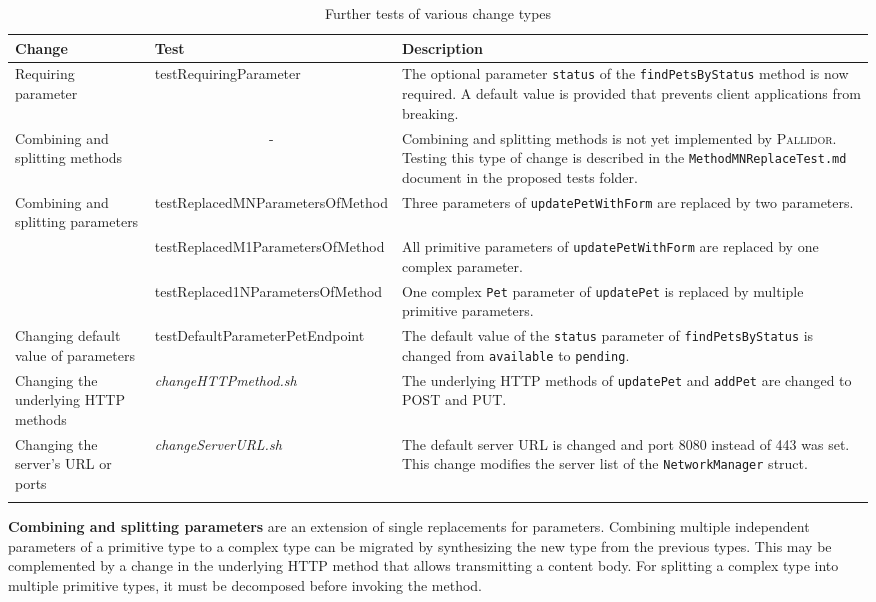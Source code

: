 	\begin{center}
	\begin{longtable}{@{}>{\raggedright\arraybackslash}p{}p{}p{}@{}}
		\toprule
		\textbf{Change} & \textbf{Test}  & \textbf{Description} \\ \midrule \endhead
		Requiring parameter &    test\-Requiring\-Parameter           &   The optional parameter \texttt{status} of the \texttt{findPetsByStatus} method is now required. A default value is provided that prevents client applications from breaking.                                       \\ 
		Combining and splitting methods	&              \multicolumn{1}{c}{-}  &         Combining and splitting methods is not yet implemented by \textsc{Pallidor}. Testing this type of change is described in the \texttt{MethodMNReplaceTest.md} document in the proposed tests folder.                               \\
	Combining and splitting parameters &      test\-Replaced\-MN\-Parameters\-Of\-Method         &             Three parameters of \texttt{updatePetWithForm} are replaced by two parameters.             \\
			&      test\-Replaced\-M1\-Parameters\-Of\-Method                    &         All primitive parameters of \texttt{updatePetWithForm} are replaced by one complex parameter.        \\
			&      test\-Replaced\-1N\-Parameters\-Of\-Method                     &         One complex \texttt{Pet} parameter of \texttt{updatePet} is replaced by multiple primitive parameters.             \\
				 Changing default value of parameters &    test\-Default\-Parameter\-Pet\-Endpoint          &   The default value of the \texttt{status} parameter of \texttt{find\-PetsByStatus} is changed from \texttt{available} to \texttt{pending}.     \\
	Changing the underlying HTTP methods	&     \textit{changeHTTPmethod.sh}         &      The underlying HTTP methods of \texttt{updatePet} and \texttt{addPet} are changed to POST and PUT.                                \\ 
	 Changing the server's URL or ports	&    \textit{changeServerURL.sh}           &         The default server URL is changed and port 8080 instead of 443 was set. This change modifies the server list of the \texttt{NetworkManager} struct.     \\  \bottomrule
	\caption{Further tests of various change types}
\label{tab:OtherChangeTypesTests}	
\end{longtable}
\end{center}
\vspace{-1cm}
\textbf{Combining and splitting parameters} are an extension of single replacements for parameters. Combining multiple independent parameters of a primitive type to a complex type can be migrated by synthesizing the new type from the previous types. This may be complemented by a change in the underlying HTTP method that allows transmitting a content body. For splitting a complex type into multiple primitive types, it must be decomposed before invoking the method.

